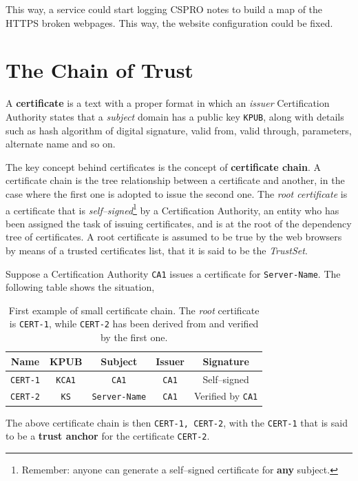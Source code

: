 \documentclass[10pt]{\classname}
\begin{document}
This way, a service could start logging CSPRO notes to build a map of the
HTTPS broken webpages. This way, the website configuration could be fixed.

\section{The Chain of Trust}

A \textbf{certificate} is a text with a proper format in which an \emph{issuer}
Certification Authority states that a \emph{subject} domain has a public key
\texttt{KPUB}, along with details such as hash algorithm of digital signature,
valid from, valid through, parameters, alternate name and so on.

The key concept behind certificates is the concept of \textbf{certificate
chain}. A certificate chain is the tree relationship between a certificate and
another, in the case where the first one is adopted to issue the second one.
The \emph{root certificate} is a certificate that is
\emph{self--signed}\footnote{Remember: anyone can generate a self--signed certificate
for \textbf{any} subject.} by a Certification Authority, an entity who has been
assigned the task of issuing certificates, and is at the root of the dependency
tree of certificates. A root certificate is assumed to be true by the web
browsers by means of a trusted certificates list, that it is said to be the
\emph{TrustSet}.

Suppose a Certification Authority \texttt{CA1} issues a certificate for
\texttt{Server\--Name}. The following table shows the situation,
\begin{table}[ht]
\centering
\begin{tabular}{ccccc}
    \textbf{Name} & \textbf{KPUB} & \textbf{Subject} & \textbf{Issuer} & \textbf{Signature} \\
    \hline
    \texttt{CERT-1} & \texttt{KCA1} & \texttt{CA1} & \texttt{CA1} & Self--signed \\
    \texttt{CERT-2} & \texttt{KS} & \texttt{Server-Name} & \texttt{CA1} & Verified by \texttt{CA1}
\end{tabular}
\caption{First example of small certificate chain. The \emph{root} certificate
    is \texttt{CERT-1}, while \texttt{CERT-2} has been derived from and
    verified by the first one.}\label{tab:certificateChain1}
\end{table}
\bigskip

The above certificate chain is then \texttt{CERT-1, CERT-2}, with the
\texttt{CERT-1} that is said to be a \textbf{trust anchor} for the certificate
\texttt{CERT-2}.
\end{document}
